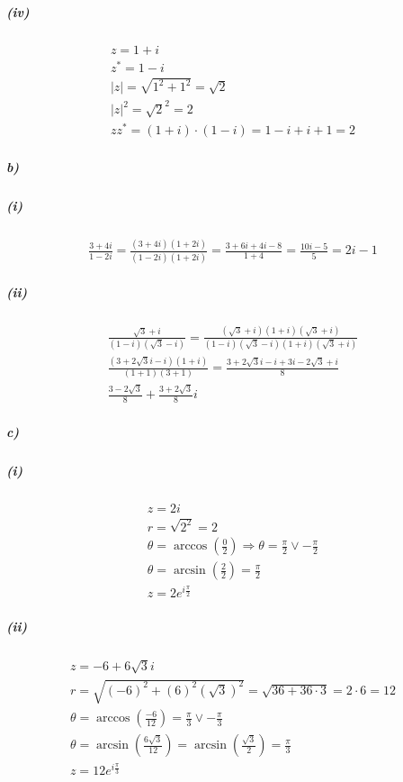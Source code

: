 \documentclass[11pt, A4paper,norsk]{article}
\begin{document}
				\subparagraph{(iv)}
					\begin{gather}
z = 1 + i \\
z^{*} = 1 - i \\
|z| = \sqrt{1^{2} + 1^{2}} = \sqrt{2} \\
|z|^{2} = \sqrt{2}^{2} = 2 \\
zz^{*} = (1 + i) \cdot (1 - i) = 1 - i + i + 1 = 2
					\end{gather}







			\subparagraph{b)}
				\subparagraph{(i)}
					\begin{gather}
\frac{3 + 4i}{1 - 2i} = \frac{(3 + 4i)(1 + 2i)}{(1 - 2i)(1 + 2i)} = \frac{3 + 6i + 4i - 8}{1 + 4} = \frac{10i - 5}{5} = 2i - 1
					\end{gather}








				\subparagraph{(ii)}
					\begin{gather}
\frac{\sqrt{3} + i}{(1 - i)(\sqrt{3} - i)} = \frac{(\sqrt{3} + i)(1 + i)(\sqrt{3} + i)}{(1 - i)(\sqrt{3} - i)(1 + i)(\sqrt{3} + i)} \\
\frac{(3 + 2\sqrt{3}i - i)(1 + i)}{(1 + 1)(3 + 1)} = \frac{3 + 2\sqrt{3}i - i + 3i - 2\sqrt{3} + i}{8} \\
\frac{3 - 2\sqrt{3}}{8} + \frac{3 + 2\sqrt{3}}{8}i
					\end{gather}
				








			\subparagraph{c)}
				\subparagraph{(i)}
					\begin{gather}
z = 2i \\
r = \sqrt{2^{2}} = 2 \\
\theta = \arccos\left(\frac{0}{2}\right) \Rightarrow \theta = \frac{\pi}{2} \vee -\frac{\pi}{2} \\
\theta = \arcsin\left( \frac{2}{2} \right) = \frac{\pi}{2} \\
z = 2e^{i\frac{\pi}{2}}
					\end{gather}








				\subparagraph{(ii)}
					\begin{gather}
z = -6 + 6\sqrt{3}i \\
r = \sqrt{(-6)^{2} + (6)^{2}(\sqrt{3})^{2}} = \sqrt{36 + 36 \cdot 3} = 2 \cdot 6 = 12 \\
\theta = \arccos\left( \frac{-6}{12} \right) = \frac{\pi}{3} \vee -\frac{\pi}{3} \\
\theta = \arcsin\left( \frac{6\sqrt{3}}{12} \right) = \arcsin\left( \frac{\sqrt{3}}{2} \right) = \frac{\pi}{3} \\
z = 12e^{i\frac{\pi}{3}}
					\end{gather}
\end{document}
